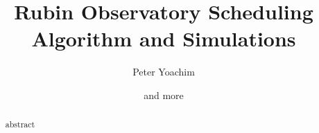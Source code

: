 \documentclass[]{aastex631}
\begin{document}
\title{Rubin Observatory Scheduling Algorithm and Simulations}




\author[0000-0003-2874-6464]{Peter Yoachim}

\author{and more}




\begin{abstract}

abstract

\end{abstract}

\end{document}
